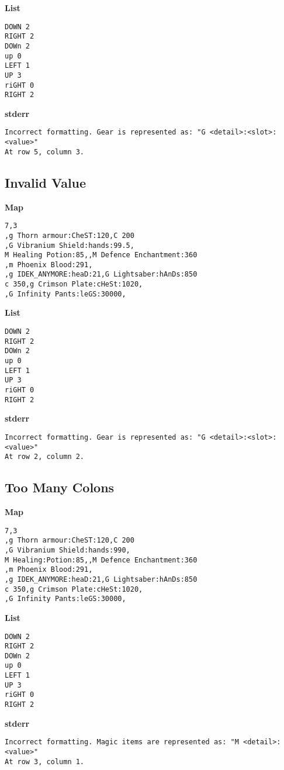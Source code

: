 \documentclass{article}
\begin{document}
\textbf{List}
\begin{lstlisting}
DOWN 2
RIGHT 2
DOWn 2
up 0
LEFT 1
UP 3
riGHT 0
RIGHT 2
\end{lstlisting}
\pagebreak

\textbf{stderr}
\begin{lstlisting}
Incorrect formatting. Gear is represented as: "G <detail>:<slot>:<value>"
At row 5, column 3.
\end{lstlisting}

\subsection{Invalid Value}

\quad \textbf{Map}
\begin{lstlisting}
7,3
,g Thorn armour:CheST:120,C 200
,G Vibranium Shield:hands:99.5,
M Healing Potion:85,,M Defence Enchantment:360
,m Phoenix Blood:291,
,g IDEK_ANYMORE:heaD:21,G Lightsaber:hAnDs:850
c 350,g Crimson Plate:cHeSt:1020,
,G Infinity Pants:leGS:30000,
\end{lstlisting}

\textbf{List}
\begin{lstlisting}
DOWN 2
RIGHT 2
DOWn 2
up 0
LEFT 1
UP 3
riGHT 0
RIGHT 2
\end{lstlisting}
\pagebreak

\textbf{stderr}
\begin{lstlisting}
Incorrect formatting. Gear is represented as: "G <detail>:<slot>:<value>"
At row 2, column 2.
\end{lstlisting}

\subsection{Too Many Colons}

\quad \textbf{Map}
\begin{lstlisting}
7,3
,g Thorn armour:CheST:120,C 200
,G Vibranium Shield:hands:990,
M Healing:Potion:85,,M Defence Enchantment:360
,m Phoenix Blood:291,
,g IDEK_ANYMORE:heaD:21,G Lightsaber:hAnDs:850
c 350,g Crimson Plate:cHeSt:1020,
,G Infinity Pants:leGS:30000,
\end{lstlisting}

\textbf{List}
\begin{lstlisting}
DOWN 2
RIGHT 2
DOWn 2
up 0
LEFT 1
UP 3
riGHT 0
RIGHT 2
\end{lstlisting}
\pagebreak

\textbf{stderr}
\begin{lstlisting}
Incorrect formatting. Magic items are represented as: "M <detail>:<value>"
At row 3, column 1.
\end{lstlisting}
\end{document}
